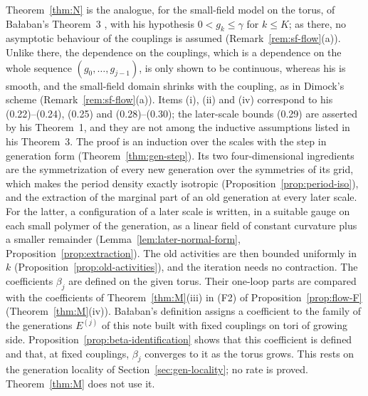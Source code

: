 Theorem~\ref{thm:N} is the analogue, for the small-field model on the torus, of Ba\l aban's Theorem~3 \cite{BalYM4I}, with his hypothesis $0<g_k\le\gamma$ for $k\le K$; as there, no asymptotic behaviour of the couplings is assumed (Remark~\ref{rem:sf-flow}(a)). Unlike there, the dependence on the couplings, which is a dependence on the whole sequence $(g_0,\dots,g_{j-1})$, is only shown to be continuous, whereas his is smooth, and the small-field domain shrinks with the coupling, as in Dimock's scheme (Remark~\ref{rem:sf-flow}(a)). Items (i), (ii) and (iv) correspond to his (0.22)--(0.24), (0.25) and (0.28)--(0.30); the later-scale bounds (0.29) are asserted by his Theorem~1, and they are not among the inductive assumptions listed in his Theorem~3. The proof is an induction over the scales with the step in generation form (Theorem~\ref{thm:gen-step}). Its two four-dimensional ingredients are the symmetrization of every new generation over the symmetries of its grid, which makes the period density exactly isotropic (Proposition~\ref{prop:period-iso}), and the extraction of the marginal part of an old generation at every later scale. For the latter, a configuration of a later scale is written, in a suitable gauge on each small polymer of the generation, as a linear field of constant curvature plus a smaller remainder (Lemma~\ref{lem:later-normal-form}, Proposition~\ref{prop:extraction}). The old activities are then bounded uniformly in $k$ (Proposition~\ref{prop:old-activities}), and the iteration needs no contraction. The coefficients $\beta_j$ are defined on the given torus. Their one-loop parts are compared with the coefficients of Theorem~\ref{thm:M}(iii) in (F2) of Proposition~\ref{prop:flow-F} (Theorem~\ref{thm:M}(iv)). Ba\l aban's definition \cite[(1.20)--(1.22)]{BalYM4I} assigns a coefficient to the family of the generations $E^{(j)}$ of this note built with fixed couplings on tori of growing side. Proposition~\ref{prop:beta-identification} shows that this coefficient is defined and that, at fixed couplings, $\beta_j$ converges to it as the torus grows. This rests on the generation locality of Section~\ref{sec:gen-locality}; no rate is proved. Theorem~\ref{thm:M} does not use it.

